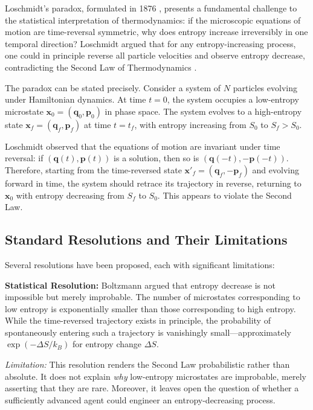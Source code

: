 \documentclass[twocolumn,10pt]{article}
\theoremstyle{definition}
\theoremstyle{remark}
\begin{document}
Loschmidt's paradox, formulated in 1876 \cite{loschmidt1876}, presents a fundamental challenge to the statistical interpretation of thermodynamics: if the microscopic equations of motion are time-reversal symmetric, why does entropy increase irreversibly in one temporal direction? Loschmidt argued that for any entropy-increasing process, one could in principle reverse all particle velocities and observe entropy decrease, contradicting the Second Law of Thermodynamics \cite{boltzmann1877}.

The paradox can be stated precisely. Consider a system of $N$ particles evolving under Hamiltonian dynamics. At time $t = 0$, the system occupies a low-entropy microstate $\mathbf{x}_0 = (\mathbf{q}_0, \mathbf{p}_0)$ in phase space. The system evolves to a high-entropy state $\mathbf{x}_f = (\mathbf{q}_f, \mathbf{p}_f)$ at time $t = t_f$, with entropy increasing from $S_0$ to $S_f > S_0$.

Loschmidt observed that the equations of motion are invariant under time reversal: if $(\mathbf{q}(t), \mathbf{p}(t))$ is a solution, then so is $(\mathbf{q}(-t), -\mathbf{p}(-t))$. Therefore, starting from the time-reversed state $\mathbf{x}'_f = (\mathbf{q}_f, -\mathbf{p}_f)$ and evolving forward in time, the system should retrace its trajectory in reverse, returning to $\mathbf{x}_0$ with entropy decreasing from $S_f$ to $S_0$. This appears to violate the Second Law.

\subsection{Standard Resolutions and Their Limitations}

Several resolutions have been proposed, each with significant limitations:

\textbf{Statistical Resolution:} Boltzmann \cite{boltzmann1877} argued that entropy decrease is not impossible but merely improbable. The number of microstates corresponding to low entropy is exponentially smaller than those corresponding to high entropy. While the time-reversed trajectory exists in principle, the probability of spontaneously entering such a trajectory is vanishingly small—approximately $\exp(-\Delta S / k_B)$ for entropy change $\Delta S$.

\textit{Limitation:} This resolution renders the Second Law probabilistic rather than absolute. It does not explain \textit{why} low-entropy microstates are improbable, merely asserting that they are rare. Moreover, it leaves open the question of whether a sufficiently advanced agent could engineer an entropy-decreasing process.
\end{document}
